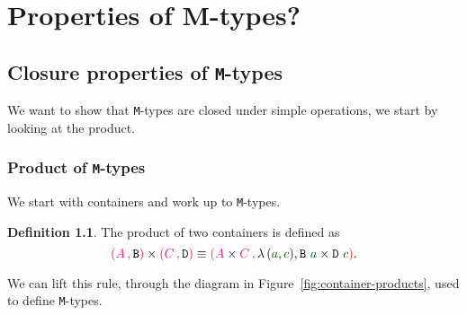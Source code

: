 \documentclass[twoside,11pt,openright]{report}
\theoremstyle{plain} %
\theoremstyle{definition}
\newtheorem{defn}{Definition}[section]
\theoremstyle{remark}
\newcommand*{\figref}[1]{Figure~\ref{fig:#1}}
\newcommand*{\term}[1]{\textcolor{green!30!black}{#1}} %
\newcommand*{\type}[1]{\textcolor{magenta!90!black}{#1}}
\newcommand*{\containerpair}[2]{\textcolor{red}{(}#1\,\textcolor{red}{,}\,#2\textcolor{red}{)}}
\newcommand*{\typeformer}[1]{\ensuremath{\mathtt{#1}}}
\begin{document}

\chapter{Properties of M-types?}
\section{Closure properties of \texttt{M}-types}
We want to show that \texttt{M}-types are closed under simple operations, we start by looking at the product.
\subsection{Product of \texttt{M}-types}
We start with containers and work up to \texttt{M}-types.
\begin{defn}
  The product of two containers is defined as \cite{ContainerRules}
  \begin{equation}
    \containerpair{\type{A}}{\typeformer{B}} \times \containerpair{\type{C}}{\typeformer{D}} \equiv \containerpair{\type{A} \times \type{C}}{\lambda\,(\term{a} , \term{c}), \typeformer{B}~\term{a} \times \typeformer{D}~\term{c}}.
  \end{equation}
\end{defn}
\noindent We can lift this rule, through the diagram in \figref{container-products}, used to define \texttt{M}-types.
\end{document}
